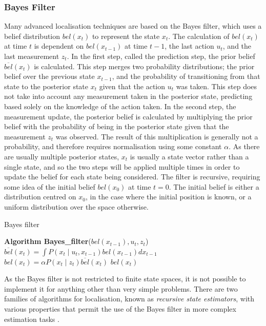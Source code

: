 \documentclass[conference]{IEEEtran}
\begin{document}
\subsubsection{Bayes Filter}
Many advanced localisation techniques are based on the Bayes filter, which uses a belief distribution $bel(x_t)$ to represent the state $x_t$. The calculation of $bel(x_t)$ at time $t$ is dependent on $bel(x_{t-1})$ at time $t-1$, the last action $u_t$, and the last measurement $z_t$. In the first step, called the prediction step, the prior belief $\overline{bel}(x_t)$ is calculated. This step merges two probability distributions; the prior belief over the previous state $x_{t-1}$, and the probability of transitioning from that state to the posterior state $x_t$ given that the action $u_t$ was taken. This step does not take into account any measurement taken in the posterior state, predicting based solely on the knowledge of the action taken. In the second step, the measurement update, the posterior belief is calculated by multiplying the prior belief with the probability of being in the posterior state given that the measurement $z_t$ was observed. The result of this multiplication is generally not a probability, and therefore requires normalisation using some constant $\alpha$. As there are usually multiple posterior states, $x_t$ is usually a state vector rather than a single state, and so the two steps will be applied multiple times in order to update the belief for each state being considered. The filter is recursive, requiring some idea of the initial belief $bel(x_0)$ at time $t=0$. The initial belief is either a distribution centred on $x_0$, in the case where the initial position is known, or a uniform distribution over the space otherwise.
\begin{algorithm}
  \caption{Bayes filter \cite{thrun}}
  \label{alg:bayesfilter}
  \begin{algorithmic}[1]
        \State \textbf{Algorithm Bayes\_filter}\textnormal{($bel(x_{t-1}), u_t, z_t$)}
        \State $\overline{bel}(x_t)=\int P(x_t\mid u_t, x_{t-1})bel(x_{t-1})dx_{t-1}$
        \State $bel(x_t)=\alpha P(x_t \mid z_t)\overline{bel}(x_t)$
        \EndFor
        \State \Return $bel(x_t)$
  \end{algorithmic}
\end{algorithm}
As the Bayes filter is not restricted to finite state spaces, it is not possible to implement it for anything other than very simple problems. There are two families of algorithms for localisation, known as \emph{recursive state estimators}, with various properties that permit the use of the Bayes filter in more complex estimation tasks \cite{thrun}.
\end{document}
